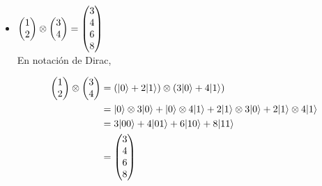 \documentclass[osajnl,preprint,showpacs,superscriptaddress,10pt]{revtex4-1} %
\DeclarePairedDelimiter\ket{\lvert}{\rangle}
\begin{document}
\begin{itemize}
    \item $\begin{pmatrix}1 \\ 2\end{pmatrix} \tens \begin{pmatrix}3 \\ 4\end{pmatrix} = \begin{pmatrix}3 \\ 4 \\ 6 \\ 8\end{pmatrix}$ \\
    
    En notación de Dirac,
    \begin{fleqn}[\parindent]
    \begin{equation}
    \begin{split}
        \begin{pmatrix}1 \\ 2\end{pmatrix} \tens \begin{pmatrix}3 \\ 4\end{pmatrix}
            &= (\ket{0} + 2\ket{1}) \tens (3\ket{0} + 4\ket{1}) \\
            &= \ket{0} \tens 3\ket{0} + \ket{0} \tens 4\ket{1} + 2\ket{1} \tens 3\ket{0} + 2\ket{1} \tens 4\ket{1} \\
            &= 3\ket{00} + 4\ket{01} + 6\ket{10} + 8\ket{11} \\
            &= \begin{pmatrix}3 \\ 4 \\ 6 \\ 8\end{pmatrix}
    \end{split}
    \end{equation}
    \end{fleqn}
    

\end{itemize}
\end{document}
